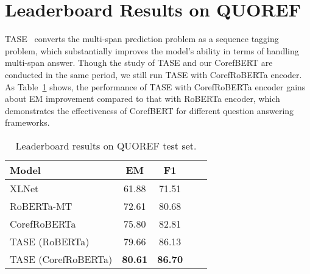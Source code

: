\documentclass[11pt,a4paper]{article}
\newcommand\CorefBERT{CorefBERT\xspace}
\newcommand\LARGESIZE{\xspace}
\begin{document}
\section{Leaderboard Results on QUOREF } 

TASE~\citep{TASE} converts the multi-span prediction problem as a sequence tagging problem, which substantially improves the model's ability in terms of handling multi-span answer. Though the study of TASE and our \CorefBERT are conducted in the same period, we still run TASE with CorefRoBERTa encoder. As Table~\ref{quorefleaderboard} shows, the performance of TASE with CorefRoBERTa encoder gains about  EM improvement compared to that with RoBERTa encoder, which demonstrates the effectiveness of \CorefBERT for different question answering frameworks.

\begin{table}[h]
\small
\centering
\begin{tabular}{l c c c c}
\toprule
Model                              & EM        & F1 \\
\midrule
XLNet~\citep{QUOREF} &  61.88 & 71.51 \\ 
RoBERTa-MT  & 72.61 & 80.68 \\
CorefRoBERTa\LARGESIZE  &  {75.80} & {82.81} \\
TASE (RoBERTa)~\citep{TASE} &  79.66 & 86.13 \\
TASE (CorefRoBERTa) & \bf{80.61} & \bf{86.70} \\
\bottomrule
\end{tabular}
\caption{Leaderboard results on QUOREF test set.}
\label{quorefleaderboard}
\end{table}
\end{document}
